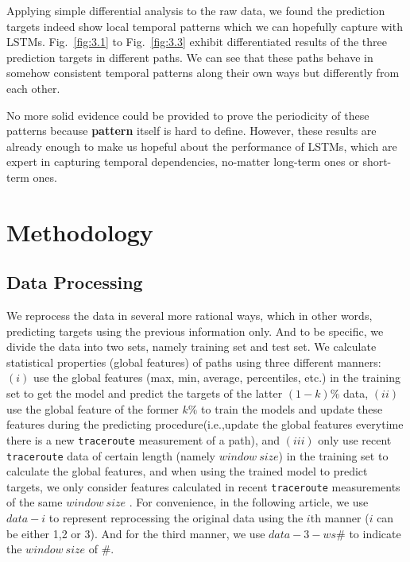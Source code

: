 \documentclass[sigconf]{acmart}
\begin{document}
	Applying simple differential analysis to the raw data, we found the prediction targets indeed show local temporal patterns which we can hopefully capture with LSTMs. Fig.~\ref{fig:3.1} to Fig.~\ref{fig:3.3} exhibit differentiated results of the three prediction targets in different paths. We can see that these paths behave in somehow consistent temporal patterns along their own ways but differently from each other.
	
	No more solid evidence could be provided to prove the periodicity of these patterns because \textbf{pattern} itself is hard to define. However, these results are already enough to make us hopeful about the performance of LSTMs, which are expert in capturing temporal dependencies, no-matter long-term ones or short-term ones.

	\section{Methodology}
	\subsection{Data Processing}
	We reprocess the data in several more rational ways, which in other words, predicting targets using the previous information only. And to be specific, we divide the data into two sets, namely training set and test set. We calculate statistical properties (global features) of paths using three different manners: $(i)$ use the global features (max, min, average, percentiles, etc.) in the training set to get the model and predict the targets of the latter $(1-k)\%$ data, $(ii)$ use the global feature of the former $k\%$ to train the models and update these features during the predicting procedure(i.e.,update the global features everytime there is a new \texttt{traceroute} measurement of a path), and $(iii)$ only use recent \texttt{traceroute} data of certain length (namely $window\ size$) in the training set to calculate the global features, and when using the trained model to predict targets, we only consider features calculated in  recent \texttt{traceroute} measurements of the same $window\ size$ . For convenience, in the following article, we use $data-i$ to represent reprocessing the original data using the $i$th manner ($i$ can be either 1,2 or 3). And for the third manner, we use $data-3-ws\#$ to indicate the $window\ size$ of $\#$.
	
\end{document}

